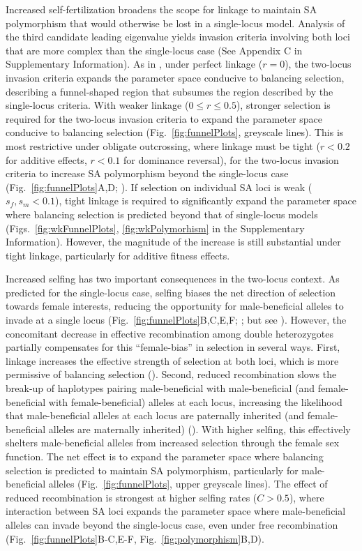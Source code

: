 \documentclass{article}
\begin{document}
Increased self-fertilization broadens the scope for linkage to maintain SA polymorphism that would otherwise be lost in a single-locus model. Analysis of the third candidate leading eigenvalue yields invasion criteria involving both loci that are more complex than the single-locus case (See Appendix C in Supplementary Information). As in \citet{Patten2010}, under perfect linkage ($r=0$), the two-locus invasion criteria expands the parameter space conducive to balancing selection, describing a funnel-shaped region that subsumes the region described by the single-locus criteria. With weaker linkage ($0 \leq r \leq 0.5$), stronger selection is required for the two-locus invasion criteria to expand the parameter space conducive to balancing selection (Fig.~\ref{fig:funnelPlots}, greyscale lines). This is most restrictive under obligate outcrossing, where linkage must be tight ($r < 0.2$ for additive effects, $r < 0.1$ for dominance reversal), for the two-locus invasion criteria to increase SA polymorphism beyond the single-locus case (Fig.~\ref{fig:funnelPlots}A,D; \citealt{Patten2010}). If selection on individual SA loci is weak ($s_f,s_m < 0.1$), tight linkage is required to significantly expand the parameter space where balancing selection is predicted beyond that of single-locus models (Figs.~\ref{fig:wkFunnelPlots}, \ref{fig:wkPolymorhism} in the Supplementary Information). However, the magnitude of the increase is still substantial under tight linkage, particularly for additive fitness effects.

Increased selfing has two important consequences in the two-locus context. As predicted for the single-locus case, selfing biases the net direction of selection towards female interests, reducing the opportunity for male-beneficial alleles to invade at a single locus (Fig.~\ref{fig:funnelPlots}B,C,E,F; \citealt{Charlesworth1978, JordanConn2014}; but see \citealt{Tazzyman2015}). However, the concomitant decrease in effective recombination among double heterozygotes partially compensates for this ``female-bias'' in selection in several ways. First, linkage increases the effective strength of selection at both loci, which is more permissive of balancing selection (\citealt{Patten2010}). Second, reduced recombination slows the break-up of haplotypes pairing male-beneficial with male-beneficial (and female-beneficial with female-beneficial) alleles at each locus, increasing the likelihood that male-beneficial alleles at each locus are paternally inherited (and female-beneficial alleles are maternally inherited) (\citealt{Patten2010, Ubeda2010}). With higher selfing, this effectively shelters male-beneficial alleles from increased selection through the female sex function. The net effect is to expand the parameter space where balancing selection is predicted to maintain SA polymorphism, particularly for male-beneficial alleles (Fig.~\ref{fig:funnelPlots}, upper greyscale lines). The effect of reduced recombination is strongest at higher selfing rates ($C > 0.5$), where interaction between SA loci expands the parameter space where male-beneficial alleles can invade beyond the single-locus case, even under free recombination (Fig.~\ref{fig:funnelPlots}B-C,E-F, Fig.~\ref{fig:polymorphism}B,D). 
\end{document}

